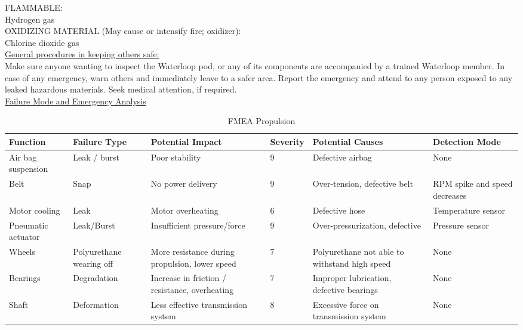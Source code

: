 \documentclass[hidelinks, twoside]{report}
\begin{document}
\begin{appendices}
\noindent FLAMMABLE:\\
\noindent Hydrogen gas\\

\noindent OXIDIZING MATERIAL (May cause or 
intensify fire; oxidizer):\\
\noindent Chlorine dioxide gas\\

\noindent \underline{General procedures in keeping others safe:}\\
    
\noindent Make sure anyone wanting to inspect the Waterloop pod, or any of its components are accompanied by a trained Waterloop member. In case of any emergency, warn others and immediately leave to a safer area. Report the emergency and attend to any person exposed to any leaked hazardous materials. Seek medical attention, if required.\\

\noindent \underline{Failure Mode and Emergency Analysis}\\

\begin{table}
\centering
  \begin{tabular}{@{}p{2cm}p{2cm}p{3cm}p{1cm}p{3cm}p{3cm}@{}} \toprule
    Function & Failure Type & Potential Impact & Severity & Potential Causes & Detection Mode \\ \midrule
    Air bag suspension & Leak / burst & Poor stability & 9 & Defective airbag & None\\
    Belt & Snap & No power delivery & 9 & Over-tension, defective belt & RPM spike and speed decreases\\
    Motor cooling & Leak & Motor overheating & 6 & Defective hose & Temperature sensor\\
    Pneumatic actuator & Leak/Burst & Insufficient pressure/force & 9 & Over-pressurization, defective & Pressure sensor \\
    Wheels & Polyurethane wearing off & More resistance during propulsion, lower speed & 7 & Polyurethane not able to withstand high speed & None \\
    Bearings & Degradation & Increase in friction / resistance, overheating & 7 & Improper lubrication, defective bearings & None \\
    Shaft & Deformation & Less effective transmission system & 8 & Excessive force on transmission system & None \\ \bottomrule
  \end{tabular}
  \caption{FMEA Propulsion}
  \label{table:fmea-propulsion}
\end{table}


\end{appendices}
\end{document}
